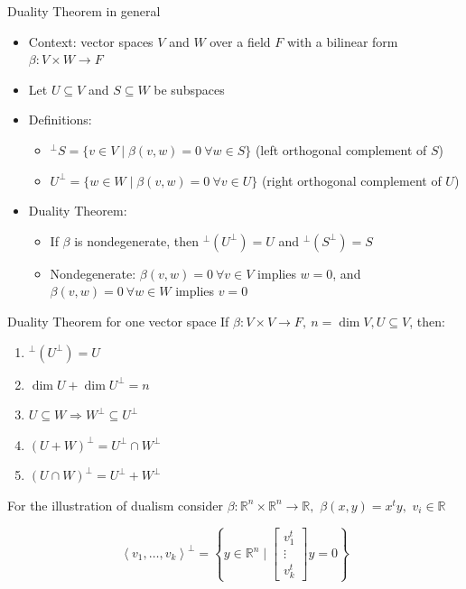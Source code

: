 \documentclass[fullscreen=true, bookmarks=true, hyperref={pdfencoding=unicode}]{beamer}
\begin{document}
\begin{frame}{Duality Theorem in general}
  \begin{itemize}
    \item Context: vector spaces $V$ and $W$ over a field $F$ with 
    a bilinear form $\beta: V \times W \rightarrow F$
    \pause\item Let $U \subseteq V$ and $S \subseteq W$ be subspaces
    \pause\item Definitions:
      \begin{itemize}
        \item $^\perp S = \{v \in V \mid \beta(v, w) = 0 \ \forall w \in S\}$ 
        (left orthogonal complement of $S$)
        \item $U^\perp = \{w \in W \mid \beta(v, w) = 0 \ \forall v \in U\}$ 
        (right orthogonal complement of $U$)
      \end{itemize}
      \pause\item Duality Theorem:
      \begin{itemize}
        \item If $\beta$ is nondegenerate, then $^\perp(U^\perp) = U$ and $^\perp(S^\perp) = S$
        \item Nondegenerate: $\beta(v, w) = 0 \ \forall v \in V$ implies $w = 0$, 
        and $\beta(v, w) = 0 \ \forall w \in W$ implies $v = 0$
      \end{itemize}
  \end{itemize}
\end{frame}


\begin{frame}{Duality Theorem for one vector space}
  If $\beta: V \times V \rightarrow F,\ n = \dim V, U \subseteq V$, then:
  \begin{enumerate}
    \item $^\perp(U^\perp) = U$ 
    \item $\dim U + \dim U^\perp = n$
    \item $U \subseteq W \Rightarrow W^\perp \subseteq U^\perp$
    \item $(U+W)^\perp = U^\perp \cap W^\perp$
    \item $(U \cap W)^\perp = U^\perp+W^\perp$
  \end{enumerate}

  \pause
  \begin{example}
    For the illustration of dualism consider 
    $\beta: \mathbb{R}^n \times \mathbb{R}^n \rightarrow \mathbb{R},$ 
    $\beta(x, y) = x^ty,$ $v_i \in \mathbb{R}$
    
    $$ \left<v_1, \dots, v_k \right>^\perp = \left\{ y \in \mathbb{R}^n \mid 
    \begin{bmatrix}
      v_1^t \\ \vdots \\ v_k^t
    \end{bmatrix} y = 0\right\} $$
  \end{example}
\end{frame}
\end{document}
